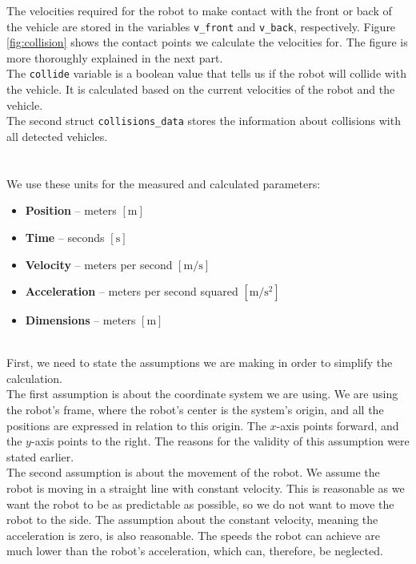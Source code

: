         The velocities required for the robot to make contact with the front or back of the vehicle are stored in the variables \texttt{v\_front} and \texttt{v\_back}, respectively. Figure \ref{fig:collision} shows the contact points we calculate the velocities for. The figure is more thoroughly explained in the next part.\\
        The \texttt{collide} variable is a boolean value that tells us if the robot will collide with the vehicle. It is calculated based on the current velocities of the robot and the vehicle.\\
        The second struct \texttt{collisions\_data} stores the information about collisions with all detected vehicles.\\\\
    \\
        We use these units for the measured and calculated parameters:
        \begin{itemize}
            \item \textbf{Position} -- meters $[\si{\m}]$
            \item \textbf{Time} -- seconds $[\si{\s}]$
            \item \textbf{Velocity} -- meters per second $[\si{\m\per\s}]$
            \item \textbf{Acceleration} -- meters per second squared $[\si{\m\per\square\s}]$
            \item \textbf{Dimensions} -- meters $[\si{\m}]$
        \end{itemize}
    \\
        First, we need to state the assumptions we are making in order to simplify the calculation.\\
        The first assumption is about the coordinate system we are using. We are using the robot's frame, where the robot's center is the system's origin, and all the positions are expressed in relation to this origin. The $x$-axis points forward, and the $y$-axis points to the right. The reasons for the validity of this assumption were stated earlier.\\
        The second assumption is about the movement of the robot. We assume the robot is moving in a straight line with constant velocity. This is reasonable as we want the robot to be as predictable as possible, so we do not want to move the robot to the side. The assumption about the constant velocity, meaning the acceleration is zero, is also reasonable. The speeds the robot can achieve are much lower than the robot's acceleration, which can, therefore, be neglected.\\
